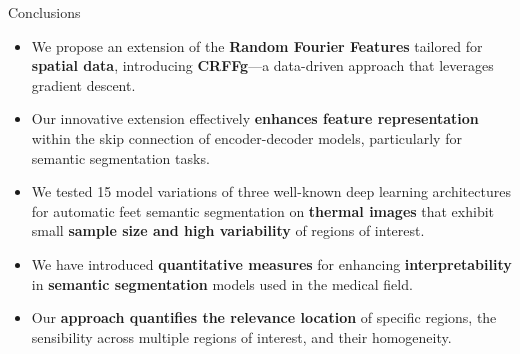 \documentclass[aspectratio=169]{beamer}
\begin{document}
\begin{frame}{Conclusions}

\begin{itemize}
    \setlength\itemsep{1em}

        \item We propose an extension of the \textbf{Random Fourier Features} tailored for \textbf{spatial data}, introducing \textbf{CRFFg}—a data-driven approach that leverages gradient descent. 
        
        \item Our innovative extension effectively \textbf{enhances feature representation} within the skip connection of encoder-decoder models, particularly for semantic segmentation tasks. 
    
    \item We tested 15 model variations of three well-known  deep learning architectures for automatic feet semantic segmentation on \textbf{thermal images} that exhibit small \textbf{sample size and high variability} of regions of interest.
    


    \item We have introduced \textbf{quantitative measures} for enhancing \textbf{interpretability} in \textbf{semantic segmentation} models used in the medical field. 
    
    \item Our \textbf{approach quantifies the relevance location} of specific regions, the sensibility across multiple regions of interest, and their homogeneity.
\end{itemize}


\end{frame}
\end{document}
